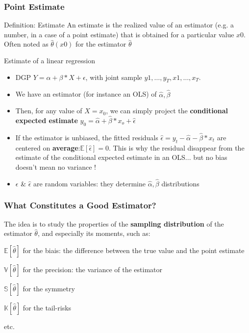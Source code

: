 \documentclass{beamer}
\newenvironment{wideitemize}{\itemize\addtolength{\itemsep}{10pt}}{\enditemize}
\begin{document}
  \begin{frame}
    \frametitle{Point Estimate}
    \begin{block}{Definition: Estimate}
      An estimate is the realized value of an estimator (e.g. a number, in a case of a point estimate) that is obtained for a particular value $x0$. Often noted as $\hat{\theta}(x0)$ for the estimator $\hat{\theta}$
    \end{block}

    \begin{exampleblock}{Estimate of a linear regression}
      \begin{itemize}
      \item DGP $Y = \alpha + \beta*X + \epsilon$, with joint sample ${y1, \dots, y_T}, {x1, \dots, x_T}$.\\
      \item We have an estimator (for instance an OLS) of $\hat{\alpha}, \hat{\beta}$
      \item Then, for any value of $X=x_0$, we can simply project the \textbf{conditional expected estimate} $y_0 = \hat{\alpha} + \hat{\beta}*x_o + \hat{\epsilon}$
      \item If the estimator is unbiased, the fitted residuals $\hat{\epsilon} = y_t - \hat{\alpha} - \hat{\beta}*x_t$ are centered on \textbf{average}:$\mathbb{E}\left[\hat{\epsilon}\right]=0$. This is why the residual disappear from the estimate of the conditional expected estimate in an OLS... but no bias doesn't mean no variance !
      \item $\epsilon$ \& $\hat{\epsilon}$ are random variables: they determine $\hat{\alpha}, \hat{\beta}$ distributions
      \end{itemize}
    \end{exampleblock}    
  \end{frame}



  
  \begin{frame}
    \frametitle{What Constitutes a Good Estimator?}
    The idea is to study the properties of the \textbf{sampling distribution} of the estimator $\hat{\theta}$, and especially its moments, such as:\\

    \medskip

    \begin{wideitemize}
    \item $\mathbb{E}[\hat{\theta}]$ for the biais: the difference between the true value and the point estimate
    \item $\mathbb{V}[\hat{\theta}]$ for the precision: the variance of the estimator
    \item $\mathbb{S}[\hat{\theta}]$ for the symmetry
    \item $\mathbb{K}[\hat{\theta}]$ for the tail-risks  
    \item etc.
    \end{wideitemize}
  \end{frame}
\end{document}
